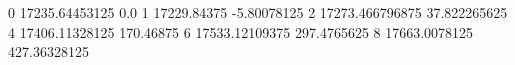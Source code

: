 0 17235.64453125 0.0
1 17229.84375 -5.80078125
2 17273.466796875 37.822265625
4 17406.11328125 170.46875
6 17533.12109375 297.4765625
8 17663.0078125 427.36328125
